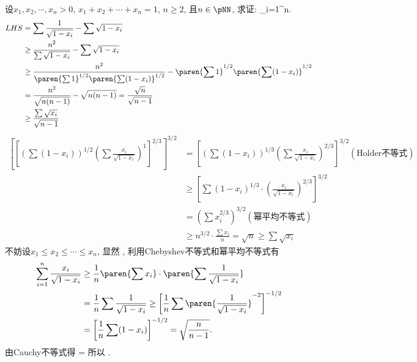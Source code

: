 \bq{}{}
设$x_{1},x_{2},\cdots,x_{n}>0$, $x_{1}+x_{2}+\cdots+x_{n}=1$, $n\ge2$,
且$n\in\pNN$, 求证:
\bee
\sum_{i=1}^{n}\ge{}.
\eee
\eq
\ba
\begin{align*}
LHS & =\sum\frac{1}{\sqrt{1-x_{i}}}-\sum\sqrt{1-x_{i}}\\
 & \ge\frac{n^{2}}{\sum\sqrt{1-x_{i}}}-\sum\sqrt{1-x_{i}}\\
 & \ge\frac{n^{2}}{\paren{\sum1}^{1/2}\paren{\sum(1-x_{i})}^{1/2}}-\paren{\sum1}^{1/2}\paren{\sum(1-x_{i})}^{1/2}\\
 & =\frac{n^{2}}{\sqrt{n(n-1)}}-\sqrt{n(n-1)}=\frac{\sqrt{n}}{\sqrt{n-1}}\\
 & \ge\frac{\sum\sqrt{x_{i}}}{\sqrt{n-1}}
\end{align*}
\ea
\ba
\begin{align*}
\left[\left[\left(\sum(1-x_{i})\right)^{1/2}\left(\sum\frac{x_{i}}{\sqrt{1-x_{i}}}\right)^{1}\right]^{2/3}\right]^{3/2} & =\left[\left(\sum(1-x_{i})\right)^{1/3}\left(\sum\frac{x_{i}}{\sqrt{1-x_{i}}}\right)^{2/3}\right]^{3/2}(\text{Holder不等式})\\
 & \ge\left[\sum(1-x_{i})^{1/3}\cdot\left(\frac{x_{i}}{\sqrt{1-x_{i}}}\right)^{2/3}\right]^{3/2}\\
 & =\left(\sum x_{i}^{2/3}\right)^{3/2}(\text{幂平均不等式})\\
 & \ge n^{3/2}\cdot\frac{\sum x_{i}}{n}=\sqrt{n}\ge\sum\sqrt{x_{i}}
\end{align*}
\ea
\ba
不妨设$x_1\le x_2\le\cdots\le x_n$, 显然
\bee
{}\le{}\le\cdots\le{},
\eee
利用Chebyshev不等式和幂平均不等式有
\begin{align*}
	\sum_{i=1}^{n}\frac{x_{i}}{\sqrt{1-x_{i}}} & \ge\frac{1}{n}\paren{\sum x_{i}}\cdot\paren{\sum\frac{1}{\sqrt{1-x_{i}}}}\\
	& =\frac{1}{n}\sum\frac{1}{\sqrt{1-x_{i}}}\ge\left[\frac{1}{n}\sum\paren{\frac{1}{\sqrt{1-x_{i}}}}^{-2}\right]^{-1/2}\\
	& =\left[\frac{1}{n}\sum(1-x_{i})\right]^{-1/2}=\sqrt{\frac{n}{n-1}}.
\end{align*}
由Cauchy不等式得
\bee
\sum{}\le{}=
\eee
所以
\bee
\sum{}\ge{}\ge{}.
\eee
\ea

